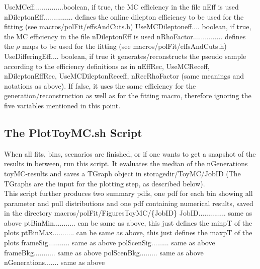 \documentclass{article}
\begin{document}
\newline UseMCeff...............boolean, if true, the MC efficiency in the file nEff is used
\newline nDileptonEff............... defines the online dilepton efficiency to be used for the
fitting (see macros/polFit/effsAndCuts.h)
\newline UseMCDileptoneff.... boolean, if true, the MC efficiency in the file nDileptonEff is used
\newline nRhoFactor............... defines the $\rho$ maps to be used for the
fitting (see macros/polFit/effsAndCuts.h)
\newline UseDifferingEff.... boolean, if true it generates/reconstructs the pseudo sample
according to the efficiency definitions as in nEffRec, UseMCReceff, nDileptonEffRec, UseMCDileptonReceff, nRecRhoFactor (same meanings and notations as above). If false, it uses the same
efficiency for the generation/reconstruction as well as for the fitting macro, therefore ignoring the five variables mentioned in this point.



\subsection{The PlotToyMC.sh Script}

When all fits, bins, scenarios are finished, or if one wants to get a snapshot of the
results in between, run this script. It evaluates the median of the nGenerations toyMC-results and saves a TGraph object in storagedir/ToyMC/JobID (The TGraphs are the input for the plotting step, as described below).\\
This script further produces two summary pdfs, one pdf for each bin showing all parameter and pull
distributions and one pdf containing numerical results, saved in the directory macros/polFit/FiguresToyMC/\{JobID\}
\newline JobID.............. same as above
\newline ptBinMin........... can be same as above, this just defines the minpT of the plots
\newline ptBinMax........... can be same as above, this just defines the maxpT of the plots
\newline frameSig........... same as above
\newline polScenSig......... same as above
\newline frameBkg........... same as above
\newline polScenBkg......... same as above
\newline nGenerations....... same as above
\end{document}
